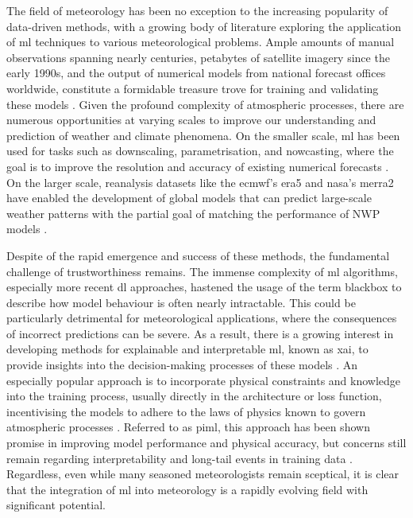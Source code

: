 The field of meteorology has been no exception to the increasing popularity of data-driven methods, with a growing body of literature exploring the application of \acrshort{ml} techniques to various meteorological problems. Ample amounts of manual observations spanning nearly centuries, petabytes of satellite imagery since the early 1990s, and the output of numerical models from national forecast offices worldwide, constitute a formidable treasure trove for training and validating these models \citep{Bracco2024,Waqas2024,Zhang2025}. Given the profound complexity of atmospheric processes, there are numerous opportunities at varying scales to improve our understanding and prediction of weather and climate phenomena. On the smaller scale, \acrshort{ml} has been used for tasks such as downscaling, parametrisation, and nowcasting, where the goal is to improve the resolution and accuracy of existing numerical forecasts \citep{Blunn2024,Zhang2023}. On the larger scale, reanalysis datasets like the \acrfull{ecmwf}'s \acrfull{era5} and \acrfull{nasa}'s \acrfull{merra2} have enabled the development of global models that can predict large-scale weather patterns with the partial goal of matching the performance of NWP models \citep{Bracco2024,Gelaro2017,Hersbach2020,Zhang2025}.

Despite of the rapid emergence and success of these methods, the fundamental challenge of trustworthiness remains. The immense complexity of \acrshort{ml} algorithms, especially more recent \acrshort{dl} approaches, hastened the usage of the term \gls{blackbox} to describe how model behaviour is often nearly intractable. This could be particularly detrimental for meteorological applications, where the consequences of incorrect predictions can be severe. As a result, there is a growing interest in developing methods for explainable and interpretable \acrshort{ml}, known as \acrfull{xai}, to provide insights into the decision-making processes of these models \citep{Molnar2025}. An especially popular approach is to incorporate physical constraints and knowledge into the training process, usually directly in the architecture or loss function, incentivising the models to adhere to the laws of physics known to govern atmospheric processes \citep{Dabrowski2020,Chen2022,Luo2025,Zhang2023}. Referred to as \acrfull{piml}, this approach has been shown promise in improving model performance and physical accuracy, but concerns still remain regarding interpretability and long-tail events in training data \citep{Lukacz2024,Radford2025,Sun2025}. Regardless, even while many seasoned meteorologists remain sceptical, it is clear that the integration of \acrshort{ml} into meteorology is a rapidly evolving field with significant potential.

